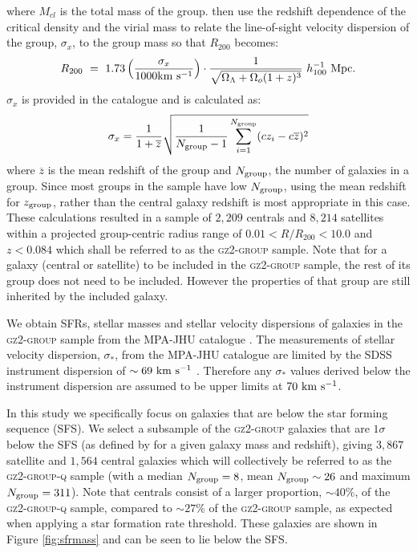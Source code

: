 \documentclass[useAMS,usenatbib]{mn2e}
\begin{document}
where $M_{cl}$ is the total mass of the group. \citeauthor{finn05} then use the redshift dependence of the critical density and the virial mass to relate the line-of-sight velocity dispersion of the group, $\sigma_x$, to the group mass so that $R_{200}$ becomes:
\begin{equation}\label{eq:r200}
R_{200}~=~1.73 \left ( \frac{\sigma_x}{1000 \rm{km}~\rm{s}^{-1}} \right) \cdot \frac{1}{\sqrt{\Omega_{\Lambda} +\Omega_o(1+z)^3}} ~ h_{100}^{-1} ~\rm{Mpc}. 
\end{equation}
$\sigma_x$ is provided in the \cite{berlind06} catalogue and is calculated as:
\begin{equation}
\sigma_x = \frac{1}{1+\overline{z}} \sqrt{\frac{1}{N_{\rm{group}}-1} \sum_{i=1}^{N_{\rm{group}}}(cz_i - c\overline{z})^2}
\end{equation}
where $\overline{z}$ is the mean redshift of the group and $N_{\rm{group}}$, the number of galaxies in a group. Since most groups in the sample have low $N_{\rm{group}}$, using the mean redshift for $z_{\rm{group}}$, rather than the central galaxy redshift is most appropriate in this case. These calculations resulted in a sample of $2,209$ centrals and $8,214$ satellites within a projected group-centric radius range of $0.01 < R/R_{200} < 10.0$ and $z < 0.084$ which shall be referred to as the \textsc{gz2-group} sample. Note that for a galaxy (central or satellite) to be included in the \textsc{gz2-group} sample, the rest of its group does not need to be included. However the properties of that group are still inherited by the included galaxy. 

We obtain SFRs, stellar masses and stellar velocity dispersions of galaxies in the \textsc{gz2-group} sample from the MPA-JHU catalogue \citep{kauffmann03, brinchmann04}. The measurements of stellar velocity dispersion, $\sigma_*$, from the MPA-JHU catalogue are limited by the SDSS instrument dispersion of $\sim69~\rm{km}~\rm{s}^{-1}$ \citep{stoughton02}. Therefore any $\sigma_*$ values derived below the instrument dispersion are assumed to be upper limits at $70~\rm{km}~\rm{s}^{-1}$. 

In this study we specifically focus on galaxies that are below the star forming sequence (SFS). We select a subsample of the \textsc{gz2-group} galaxies that are $1\sigma$ below the SFS (as defined by \citealt{peng10} for a given galaxy mass and redshift), giving $3,867$ satellite and $1,564$ central galaxies which will collectively be referred to as the \textsc{gz2-group-q} sample (with a median $N_{\rm{group}}=8$, mean $N_{\rm{group}}\sim26$ and maximum $N_{\rm{group}}=311$). Note that centrals consist of a larger proportion, $\sim40\%$, of the \textsc{gz2-group-q} sample, compared to $\sim27\%$ of the \textsc{gz2-group} sample, as expected when applying a star formation rate threshold. These galaxies are shown in Figure \ref{fig:sfrmass} and can be seen to lie below the SFS.
\end{document}
